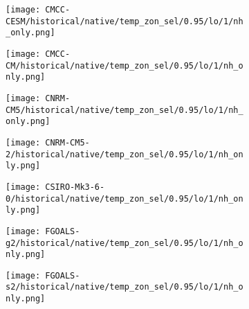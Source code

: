 \documentclass[preview]{standalone}
\begin{document}
\begin{figure}
  \begin{subfigure}[t]{\textwidth}
    \texttt{[image: CMCC-CESM/historical/native/temp\_zon\_sel/0.95/lo/1/nh\_only.png]}
  \end{subfigure}
\end{figure}

\begin{figure}
  \begin{subfigure}[t]{\textwidth}
    \texttt{[image: CMCC-CM/historical/native/temp\_zon\_sel/0.95/lo/1/nh\_only.png]}
  \end{subfigure}
\end{figure}

\begin{figure}
  \begin{subfigure}[t]{\textwidth}
    \texttt{[image: CNRM-CM5/historical/native/temp\_zon\_sel/0.95/lo/1/nh\_only.png]}
  \end{subfigure}
\end{figure}

\begin{figure}
  \begin{subfigure}[t]{\textwidth}
    \texttt{[image: CNRM-CM5-2/historical/native/temp\_zon\_sel/0.95/lo/1/nh\_only.png]}
  \end{subfigure}
\end{figure}

\begin{figure}
  \begin{subfigure}[t]{\textwidth}
    \texttt{[image: CSIRO-Mk3-6-0/historical/native/temp\_zon\_sel/0.95/lo/1/nh\_only.png]}
  \end{subfigure}
\end{figure}

\begin{figure}
  \begin{subfigure}[t]{\textwidth}
    \texttt{[image: FGOALS-g2/historical/native/temp\_zon\_sel/0.95/lo/1/nh\_only.png]}
  \end{subfigure}
\end{figure}

\begin{figure}
  \begin{subfigure}[t]{\textwidth}
    \texttt{[image: FGOALS-s2/historical/native/temp\_zon\_sel/0.95/lo/1/nh\_only.png]}
  \end{subfigure}
\end{figure}
\end{document}
